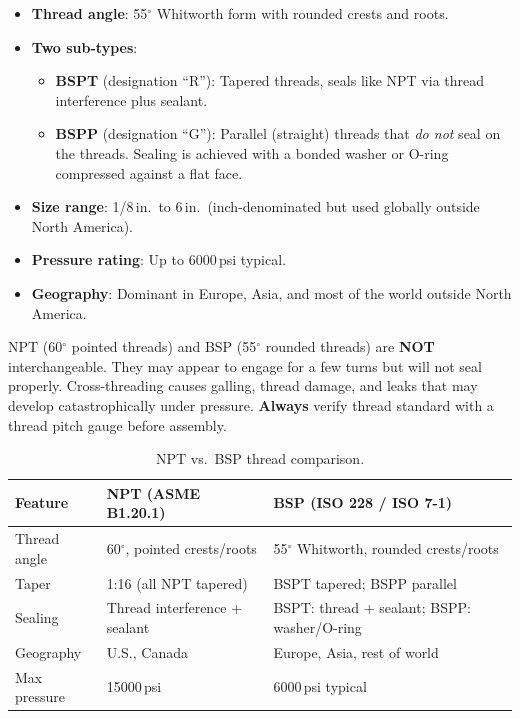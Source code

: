 \documentclass[11pt,letterpaper,twoside,openany]{book}
\providecommand{\ang}[1]{#1\ensuremath{{}^{\circ}}}
\begin{document}
\begin{itemize}[leftmargin=1.5em]
  \item \textbf{Thread angle}: \ang{55} Whitworth form with rounded crests and roots.
  \item \textbf{Two sub-types}:
  \begin{itemize}[nosep]
    \item \textbf{BSPT} (designation ``R''): Tapered threads, seals like NPT via thread interference plus sealant.
    \item \textbf{BSPP} (designation ``G''): Parallel (straight) threads that \emph{do not} seal on the threads. Sealing is achieved with a bonded washer or O-ring compressed against a flat face.
  \end{itemize}
  \item \textbf{Size range}: 1/8\,in.\ to 6\,in.\ (inch-denominated but used globally outside North America).
  \item \textbf{Pressure rating}: Up to 6000\,psi typical.
  \item \textbf{Geography}: Dominant in Europe, Asia, and most of the world outside North America.
\end{itemize}

\begin{warningbox}
NPT (\ang{60} pointed threads) and BSP (\ang{55} rounded threads) are \textbf{NOT} interchangeable. They may appear to engage for a few turns but will not seal properly. Cross-threading causes galling, thread damage, and leaks that may develop catastrophically under pressure. \textbf{Always} verify thread standard with a thread pitch gauge before assembly.
\end{warningbox}

\begin{table}[ht!]
\centering
\small
\begin{tabularx}{\textwidth}{l X X}
  \toprule
  \textbf{Feature} & \textbf{NPT (ASME B1.20.1)} & \textbf{BSP (ISO 228 / ISO 7-1)} \\
  \midrule
  Thread angle & \ang{60}, pointed crests/roots & \ang{55} Whitworth, rounded crests/roots \\
  Taper & 1:16 (all NPT tapered) & BSPT tapered; BSPP parallel \\
  Sealing & Thread interference + sealant & BSPT: thread + sealant; BSPP: washer/O-ring \\
  Geography & U.S., Canada & Europe, Asia, rest of world \\
  Max pressure & 15000\,psi & 6000\,psi typical \\
  \bottomrule
\end{tabularx}
\caption{NPT vs.\ BSP thread comparison.}
\end{table}
\end{document}
